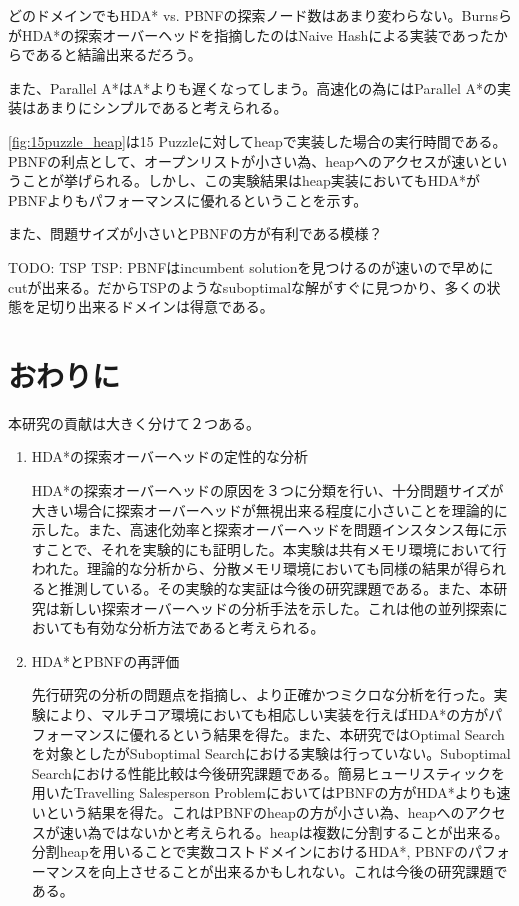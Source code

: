 \documentclass{jsarticle}
\begin{document}
どのドメインでもHDA* vs. PBNFの探索ノード数はあまり変わらない。BurnsらがHDA*の探索オーバーヘッドを指摘したのはNaive Hashによる実装であったからであると結論出来るだろう。

また、Parallel A*はA*よりも遅くなってしまう。高速化の為にはParallel A*の実装はあまりにシンプルであると考えられる。

\ref{fig:15puzzle_heap}は15 Puzzleに対してheapで実装した場合の実行時間である。PBNFの利点として、オープンリストが小さい為、heapへのアクセスが速いということが挙げられる。しかし、この実験結果はheap実装においてもHDA*がPBNFよりもパフォーマンスに優れるということを示す。

また、問題サイズが小さいとPBNFの方が有利である模様？
    
TODO: TSP
TSP: PBNFはincumbent solutionを見つけるのが速いので早めにcutが出来る。だからTSPのようなsuboptimalな解がすぐに見つかり、多くの状態を足切り出来るドメインは得意である。

\section{おわりに}

本研究の貢献は大きく分けて２つある。

\begin{enumerate}
\item HDA*の探索オーバーヘッドの定性的な分析

HDA*の探索オーバーヘッドの原因を３つに分類を行い、十分問題サイズが大きい場合に探索オーバーヘッドが無視出来る程度に小さいことを理論的に示した。また、高速化効率と探索オーバーヘッドを問題インスタンス毎に示すことで、それを実験的にも証明した。本実験は共有メモリ環境において行われた。理論的な分析から、分散メモリ環境においても同様の結果が得られると推測している。その実験的な実証は今後の研究課題である。また、本研究は新しい探索オーバーヘッドの分析手法を示した。これは他の並列探索においても有効な分析方法であると考えられる。
\newline

\item HDA*とPBNFの再評価

先行研究の分析の問題点を指摘し、より正確かつミクロな分析を行った。実験により、マルチコア環境においても相応しい実装を行えばHDA*の方がパフォーマンスに優れるという結果を得た。また、本研究ではOptimal Searchを対象としたがSuboptimal Searchにおける実験は行っていない。Suboptimal Searchにおける性能比較は今後研究課題である。簡易ヒューリスティックを用いたTravelling Salesperson ProblemにおいてはPBNFの方がHDA*よりも速いという結果を得た。これはPBNFのheapの方が小さい為、heapへのアクセスが速い為ではないかと考えられる。heapは複数に分割することが出来る。分割heapを用いることで実数コストドメインにおけるHDA*, PBNFのパフォーマンスを向上させることが出来るかもしれない。これは今後の研究課題である。

\end{enumerate}
\end{document}
